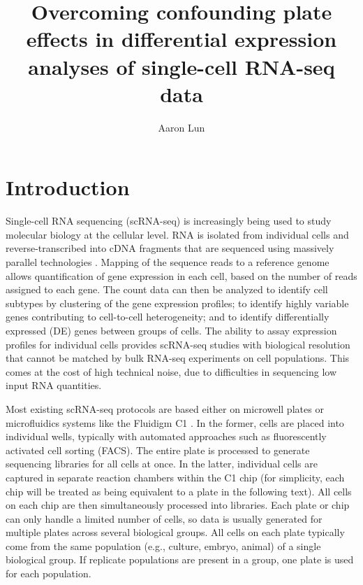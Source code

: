 \documentclass{article}
\title{Overcoming confounding plate effects in differential expression analyses of single-cell RNA-seq data}
\author{Aaron Lun}
\begin{document}
\maketitle

\section{Introduction}
Single-cell RNA sequencing (scRNA-seq) is increasingly being used to study molecular biology at the cellular level.
RNA is isolated from individual cells and reverse-transcribed into cDNA fragments that are sequenced using massively parallel technologies \cite{stegle2015computational}.
Mapping of the sequence reads to a reference genome allows quantification of gene expression in each cell, based on the number of reads assigned to each gene.
The count data can then be analyzed to identify cell subtypes by clustering of the gene expression profiles;
    to identify highly variable genes contributing to cell-to-cell heterogeneity;
    and to identify differentially expressed (DE) genes between groups of cells.
The ability to assay expression profiles for individual cells provides scRNA-seq studies with biological resolution that cannot be matched by bulk RNA-seq experiments on cell populations.
This comes at the cost of high technical noise, due to difficulties in sequencing low input RNA quantities.

Most existing scRNA-seq protocols are based either on microwell plates \cite{picelli2014full} or microfluidics systems like the Fluidigm C1 \cite{pollen2014low}.
In the former, cells are placed into individual wells, typically with automated approaches such as fluorescently activated cell sorting (FACS).
The entire plate is processed to generate sequencing libraries for all cells at once.
In the latter, individual cells are captured in separate reaction chambers within the C1 chip 
    (for simplicity, each chip will be treated as being equivalent to a plate in the following text).
All cells on each chip are then simultaneously processed into libraries.
Each plate or chip can only handle a limited number of cells, so data is usually generated for multiple plates across several biological groups. 
All cells on each plate typically come from the same population (e.g., culture, embryo, animal) of a single biological group.
If replicate populations are present in a group, one plate is used for each population.
\end{document}
